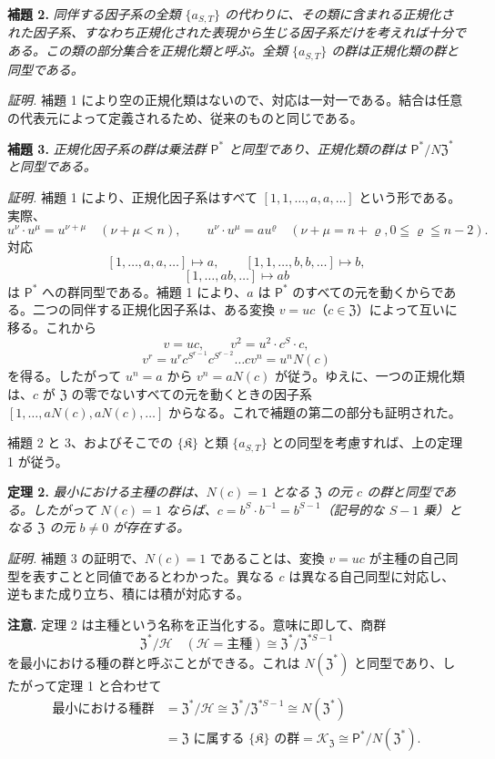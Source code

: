 \noindent\textbf{補題 2.} \emph{同伴する因子系の全類 \(\{a_{S,T}\}\) の代わりに、その類に含まれる正規化された因子系、すなわち正規化された表現から生じる因子系だけを考えれば十分である。この類の部分集合を正規化類と呼ぶ。全類 \(\{a_{S,T}\}\) の群は正規化類の群と同型である。}

\noindent\emph{証明.} 補題 1 により空の正規化類はないので、対応は一対一である。結合は任意の代表元によって定義されるため、従来のものと同じである。

\noindent\textbf{補題 3.} \emph{正規化因子系の群は乗法群 \(\mathsf P^*\) と同型であり、正規化類の群は \(\mathsf P^*/N\mathfrak Z^*\) と同型である。}

\noindent\emph{証明.} 補題 1 により、正規化因子系はすべて \([1,1,\ldots,a,a,\ldots]\) という形である。実際、
\[
u^\nu\cdot u^\mu=u^{\nu+\mu}\quad(\nu+\mu<n),
\qquad
u^\nu\cdot u^\mu=au^\varrho
\quad(\nu+\mu=n+\varrho, 0\leqq\varrho\leqq n-2).
\]
対応
\[
[1,\ldots,a,a,\ldots]\mapsto a,
\qquad
[1,1,\ldots,b,b,\ldots]\mapsto b,
\]
\[
[1,\ldots,ab,\ldots]\mapsto ab
\]
は \(\mathsf P^*\) への群同型である。補題 1 により、\(a\) は \(\mathsf P^*\) のすべての元を動くからである。二つの同伴する正規化因子系は、ある変換 \(v=uc\)（\(c\in\mathfrak Z\)）によって互いに移る。これから
\[
v=uc,\qquad v^2=u^2\cdot c^S\cdot c,
\]
\[
v^r=u^r c^{S^{r-1}}c^{S^{r-2}}\ldots c
v^n=u^nN(c)
\]
を得る。したがって \(u^n=a\) から \(v^n=aN(c)\) が従う。ゆえに、一つの正規化類は、\(c\) が \(\mathfrak Z\) の零でないすべての元を動くときの因子系 \([1,\ldots,aN(c),aN(c),\ldots]\) からなる。これで補題の第二の部分も証明された。

補題 2 と 3、およびそこでの \(\{\mathfrak K\}\) と類 \(\{a_{S,T}\}\) との同型を考慮すれば、上の定理 1 が従う。

\noindent\textbf{定理 2.} \emph{最小における主種の群は、\(N(c)=1\) となる \(\mathfrak Z\) の元 \(c\) の群と同型である。したがって \(N(c)=1\) ならば、\(c=b^S\cdot b^{-1}=b^{S-1}\)（記号的な \(S-1\) 乗）となる \(\mathfrak Z\) の元 \(b\ne0\) が存在する。}

\noindent\emph{証明.} 補題 3 の証明で、\(N(c)=1\) であることは、変換 \(v=uc\) が主種の自己同型を表すことと同値であるとわかった。異なる \(c\) は異なる自己同型に対応し、逆もまた成り立ち、積には積が対応する。

\noindent\textbf{注意.} 定理 2 は主種という名称を正当化する。意味に即して、商群
\[
\mathfrak Z^*/\mathscr H
\quad(\mathscr H=\text{主種})
\cong\mathfrak Z^*/\mathfrak Z^{*S-1}
\]
を最小における種の群と呼ぶことができる。これは \(N(\mathfrak Z^*)\) と同型であり、したがって定理 1 と合わせて
\[
\begin{aligned}
\text{最小における種群}
&=\mathfrak Z^*/\mathscr H
\cong\mathfrak Z^*/\mathfrak Z^{*S-1}
\cong N(\mathfrak Z^*)\\
&=\mathfrak Z\text{ に属する }\{\mathfrak K\}\text{ の群}
=\mathscr K_{\mathfrak Z}
\cong\mathsf P^*/N(\mathfrak Z^*).
\end{aligned}
\]

